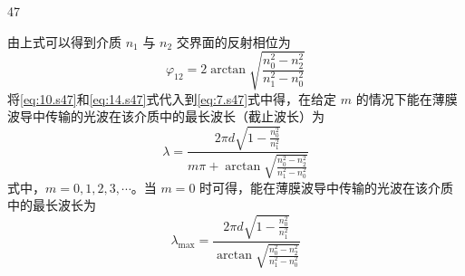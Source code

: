 \begin{solution}{47}
\begin{subsolution}
\begin{equation}
            \label{eq:13.s47}
        \end{equation}
        由上式可以得到介质 $n_{1}$ 与 $n_{2}$ 交界面的反射相位为
        \begin{equation}
            \varphi_{12} = 2\arctan\sqrt{\frac{n_{0}^{2} - n_{2}^{2}}{n_{1}^{2} - n_{0}^{2}}}
            \label{eq:14.s47}
        \end{equation}
        将\eqref{eq:10.s47}和\eqref{eq:14.s47}式代入到\eqref{eq:7.s47}式中得，在给定 $m$ 的情况下能在薄膜波导中传输的光波在该介质中的最长波长（截止波长）为
        \begin{equation}
            \lambda = \frac{2\pi d\sqrt{1 - \frac{n_{0}^{2}}{n_{1}^{2}}}}{m\pi + \arctan\sqrt{\frac{n_{0}^{2} - n_{2}^{2}}{n_{1}^{2} - n_{0}^{2}}}}
            \label{eq:15.s47}
        \end{equation}
        式中，$m = 0, 1, 2, 3, \cdots$。当 $m = 0$ 时可得，能在薄膜波导中传输的光波在该介质中的最长波长为
        \begin{equation}
            \lambda_{\max} = \frac{2\pi d\sqrt{1 - \frac{n_{0}^{2}}{n_{1}^{2}}}}{\arctan\sqrt{\frac{n_{0}^{2} - n_{2}^{2}}{n_{1}^{2} - n_{0}^{2}}}}
            \label{eq:16.s47}
        \end{equation}
    \end{subsolution}
\end{solution}